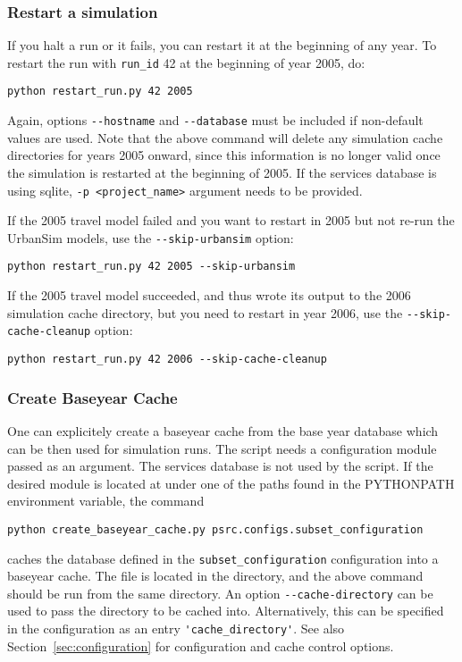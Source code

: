 \subsubsection{Restart a simulation}
If you halt a run or it fails, you can restart it at the beginning of any year.
To restart the run with \verb|run_id| 42 at the beginning of year 2005, do:

\begin{verbatim}
python restart_run.py 42 2005
\end{verbatim}
Again, options \verb|--hostname| and \verb|--database| must be included
if non-default values are used.  Note that the above command will delete any
simulation cache \simulationcacheindex directories for years 2005 onward, since
this information is no longer valid once the simulation is restarted at the
beginning of 2005. If the services database is using sqlite, \verb|-p <project_name>| 
 argument needs to be provided.  

If the 2005 travel model failed and you want to restart in 2005 but not re-run
the UrbanSim models, use the \verb|--skip-urbansim| option:

\begin{verbatim}
python restart_run.py 42 2005 --skip-urbansim
\end{verbatim}

If the 2005 travel model succeeded, and thus wrote its output to the 2006
simulation cache \simulationcacheindex directory, but you need to restart in year 2006, use the
\verb|--skip-cache-cleanup| option:

\begin{verbatim}
python restart_run.py 42 2006 --skip-cache-cleanup
\end{verbatim}

\subsubsection{Create Baseyear Cache}
\label{sec:run-manager-baseyearcache}
%
One can explicitely create a baseyear
cache from
the base year database which can be then used for simulation runs. The script
needs a configuration module passed as an argument. The services database is
not used by the script. If the desired module is located at
 under one of the paths found in the
PYTHONPATH environment variable, the command

\begin{verbatim}
python create_baseyear_cache.py psrc.configs.subset_configuration
\end{verbatim}
caches the database defined in the \verb|subset_configuration| configuration into a baseyear
cache. The  file is located in
the  directory, and the above command should be
run from the same directory. An option \verb|--cache-directory|
can be used to pass the directory to be cached into. Alternatively, this can be
specified in the configuration as an entry \verb|'cache_directory'|. See also
Section~\ref{sec:configuration} for configuration and cache control options.

